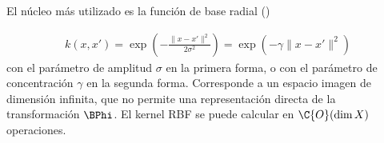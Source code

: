 El núcleo más utilizado es la función de base radial
()

\begin{align}
  k(x,x')=\exp\left(-\frac{\|x-x'\|^2}{2\sigma^2}\right)
  =\exp\left(-\gamma\|x-x'\|^2\right)
\end{align}
con el parámetro de amplitud $\sigma$ en la primera forma, o con el
parámetro de concentración $\gamma$ en la segunda forma. Corresponde
a un espacio imagen de dimensión infinita, que no permite
una representación directa de la transformación $\BPhi$.
El kernel RBF se puede calcular
en $\C{O}(\dim{}X)$ operaciones.
